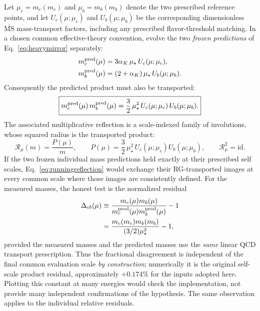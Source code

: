 \documentclass[aps,twocolumn,superscriptaddress,nofootinbib,floatfix]{revtex4-2}
\newcommand{\MSbar}{\overline{\mathrm{MS}}}
\newcommand{\mstar}{\mu_\star}
\newcommand{\alphaK}{\alpha_K}
\begin{document}
Let $\mu_c=m_c(m_c)$ and $\mu_b=m_b(m_b)$ denote the two prescribed reference points, and let $U_c(\mu;\mu_c)$ and $U_b(\mu;\mu_b)$ be the corresponding dimensionless $\MSbar$ mass-transport factors, including any prescribed flavor-threshold matching. In a chosen common effective-theory convention, evolve the two \emph{frozen predictions} of Eq.~\eqref{eq:heavymirror} separately:
\begin{equation}
\begin{split}
 m_c^{\rm pred}(\mu)&=3\alphaK\,\mstar\,U_c(\mu;\mu_c),\\
 m_b^{\rm pred}(\mu)&=(2+\alphaK)\,\mstar\,U_b(\mu;\mu_b).
\end{split}
\label{eq:heavytransport}
\end{equation}
Consequently the predicted product must also be transported:
\begin{equation}
\boxed{m_c^{\rm pred}(\mu)\,m_b^{\rm pred}(\mu)=\frac32\,\mstar^2\,U_c(\mu;\mu_c)\,U_b(\mu;\mu_b).}
\label{eq:runningcenter}
\end{equation}
The associated multiplicative reflection is a scale-indexed family of involutions, whose squared radius is the transported product:
\begin{equation}
\mathcal R_{\mu}(m)=\frac{P(\mu)}{m},\qquad P(\mu)=\frac32\,\mstar^2\,U_c(\mu;\mu_c)U_b(\mu;\mu_b),\qquad \mathcal R_{\mu}^2=\mathrm{id}.
\label{eq:runningreflection}
\end{equation}
If the two frozen individual mass predictions held exactly at their prescribed self scales, Eq.~\eqref{eq:runningreflection} would exchange their RG-transported images at every common scale where those images are consistently defined. For the measured masses, the honest test is the normalized residual
\begin{equation}
\begin{split}
\Delta_{cb}(\mu)&\equiv\frac{m_c(\mu)m_b(\mu)}{m_c^{\rm pred}(\mu)m_b^{\rm pred}(\mu)}-1\\
&=\frac{m_c(m_c)m_b(m_b)}{(3/2)\mstar^2}-1,
\end{split}
\label{eq:rgresidual}
\end{equation}
provided the measured masses and the predicted masses use the \emph{same} linear QCD transport prescription. Thus the fractional disagreement is independent of the final common evaluation scale \emph{by construction}; numerically it is the original self-scale product residual, approximately $+0.174\%$ for the inputs adopted here. Plotting this constant at many energies would check the implementation, not provide many independent confirmations of the hypothesis. The same observation applies to the individual relative residuals.
\end{document}
